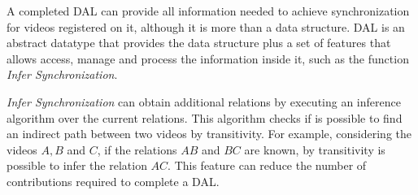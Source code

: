 A completed DAL can provide all information needed to achieve synchronization for videos registered on it, although it is more than a data structure. DAL is an abstract datatype that provides the data structure plus a set of features that allows access, manage and process the information inside it, such as the function \textit{Infer Synchronization}. 

\textit{Infer Synchronization} can obtain additional relations by executing an inference algorithm over the current relations. This algorithm checks if is possible to find an indirect path between two videos by transitivity. For example, considering the videos $A, B$ and $C$, if the relations $AB$ and $BC$ are known, by transitivity is possible to infer the relation $AC$. This feature can reduce the number of contributions required to complete a DAL. 



